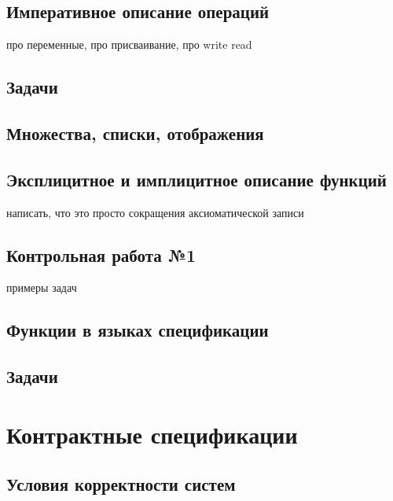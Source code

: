 \documentclass[14pt, twoside]{extreport}
\newcounter{problem_type}[chapter]
\begin{document}
\section{Императивное описание операций}
про переменные, про присваивание, про write read

    

    \section*{Задачи}

    

\section{Множества, списки, отображения}

\section{Эксплицитное и имплицитное описание функций}

написать, что это просто сокращения аксиоматической записи

\section{Контрольная работа №1}

примеры задач


\section{Функции в языках спецификации}

    

    \section*{Задачи}

    

    


\chapter{Контрактные спецификации}

\section{Условия корректности систем}
\end{document}
